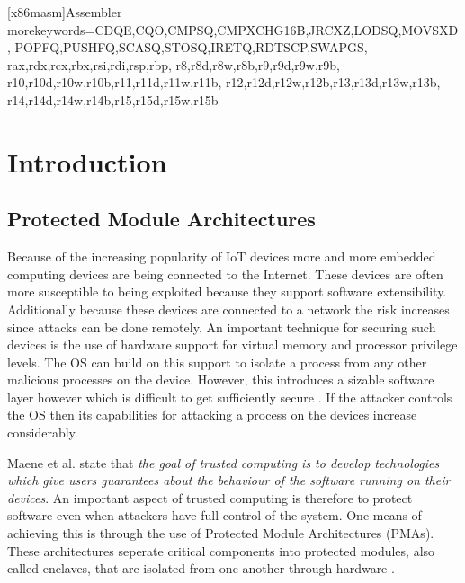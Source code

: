 
   [x86masm]{Assembler} %
   {morekeywords={CDQE,CQO,CMPSQ,CMPXCHG16B,JRCXZ,LODSQ,MOVSXD, %
                  POPFQ,PUSHFQ,SCASQ,STOSQ,IRETQ,RDTSCP,SWAPGS, %
                  rax,rdx,rcx,rbx,rsi,rdi,rsp,rbp, %
                  r8,r8d,r8w,r8b,r9,r9d,r9w,r9b, %
                  r10,r10d,r10w,r10b,r11,r11d,r11w,r11b, %
                  r12,r12d,r12w,r12b,r13,r13d,r13w,r13b, %
                  r14,r14d,r14w,r14b,r15,r15d,r15w,r15b}} %

\chapter{Introduction}
\label{cha:introduction}

\section{Protected Module Architectures}
Because of the increasing popularity of IoT devices more and more embedded computing devices are being connected to the Internet. 
These devices are often more susceptible to being exploited because they support software extensibility. 
Additionally because these devices are connected to a network the risk increases since attacks can be done remotely. 
An important technique for securing such devices is the use of hardware support for virtual memory and processor privilege levels.
The OS can build on this support to isolate a process from any other malicious processes on the device. 
However, this introduces a sizable software layer however which is difficult to get sufficiently secure \cite{psma}.
If the attacker controls the OS then its capabilities for attacking a process on the devices increase considerably. 

Maene et al. state that \textit{the goal of trusted computing is to develop technologies which give users guarantees about the behaviour of the software running on their devices}.
An important aspect of trusted computing is therefore to protect software even when attackers have full control of the system. 
One means of achieving this is through the use of Protected Module Architectures (PMAs). 
These architectures seperate critical components into protected modules, also called enclaves,
that are isolated from one another through hardware \cite{trusted-computing-architectures}.  

